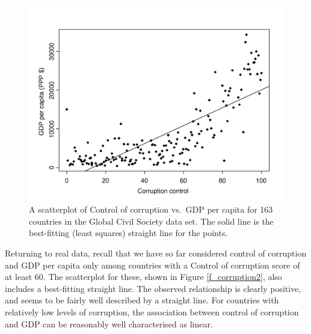 \begin{figure}[t]
\caption{A scatterplot of Control of corruption vs.\ GDP per capita for
163 countries in the Global Civil Society data set. The solid line is
the best-fitting (least squares) straight line for the points.}
\label{f_corruption3}
\vspace*{-5ex}
\includegraphics[width=13.5cm]{corruption3}
\vspace*{-2ex}
\end{figure}

Returning to real data, recall that we have so far considered control
of corruption and GDP per capita only among countries with a Control of
corruption score of at least 60. The scatterplot for these, shown in
Figure \ref{f_corruption2}, also includes a best-fitting straight line.
The observed relationship is clearly positive, and seems to be fairly
well described by a straight line. For countries with relatively low
levels of corruption, the association between control of corruption and GDP can
be reasonably well characterised as linear.

